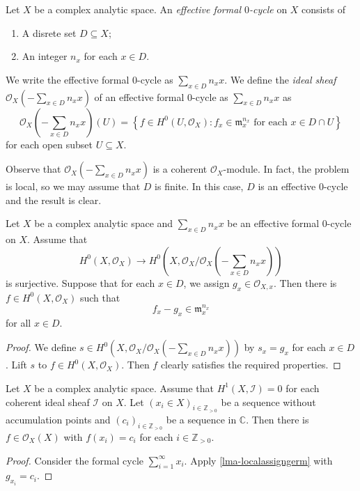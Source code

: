 \begin{definition}
    Let $X$ be a complex analytic space. An \emph{effective formal $0$-cycle} on $X$ consists of 
    \begin{enumerate}
        \item A disrete set $D\subseteq X$;
        \item An integer $n_x$ for each $x\in D$.
    \end{enumerate}
    We write the effective formal $0$-cycle as $\sum_{x\in D}n_x x$. We define the \emph{ideal sheaf} $\mathcal{O}_X(-\sum_{x\in D}n_x x)$ of an effective formal $0$-cycle as $\sum_{x\in D}n_x x$ as 
    \[
        \mathcal{O}_X(-\sum_{x\in D}n_x x)(U)=\left\{f\in H^0(U,\mathcal{O}_X): f_x\in \mathfrak{m}_x^{n_x}\text{ for each }x\in D\cap U \right\}
    \]
    for each open subset $U\subseteq X$.
\end{definition}
Observe that $\mathcal{O}_X(-\sum_{x\in D}n_x x)$ is a coherent $\mathcal{O}_X$-module. In fact, the problem is local, so we may assume that $D$ is finite. In this case, $D$ is an effective $0$-cycle and the result is clear.

\begin{lemma}\label{lma-localassigngerm}
    Let $X$ be a complex analytic space and $\sum_{x\in D}n_x x$ be an effective formal $0$-cycle on $X$. Assume that 
    \[
        H^0(X,\mathcal{O}_X)\rightarrow   H^0(X,\mathcal{O}_X/\mathcal{O}_X(-\sum_{x\in D}n_x x))
    \]
    is surjective. Suppose that for each $x\in D$, we assign $g_x\in \mathcal{O}_{X,x}$. Then there is $f\in H^0(X,\mathcal{O}_X)$ such that
    \[
        f_x-g_x\in \mathfrak{m}_x^{n_x}  
    \]
    for all $x\in D$.
\end{lemma}
\begin{proof}
    We define $s\in H^0(X,\mathcal{O}_X/\mathcal{O}_X(-\sum_{x\in D}n_x x))$ by $s_x=g_x$ for each $x\in D$. Lift $s$ to $f\in H^0(X,\mathcal{O}_X)$. Then $f$ clearly satisfies the required properties.
\end{proof}

\begin{proposition}\label{prop-assignvalue}
    Let $X$ be a complex analytic space. Assume that $H^1(X,\mathcal{I})=0$ for each coherent ideal sheaf $\mathcal{I}$ on $X$. Let $(x_i\in X)_{i\in \mathbb{Z}_{>0}}$ be a sequence without accumulation points and $(c_i)_{i\in \mathbb{Z}_{>0}}$ be a sequence in $\mathbb{C}$. Then there is $f\in \mathcal{O}_X(X)$ with $f(x_i)=c_i$ for each $i\in \mathbb{Z}_{>0}$.
\end{proposition}
\begin{proof}
    Consider the formal cycle $\sum_{i=1}^{\infty} x_i$. Apply \cref{lma-localassigngerm} with $g_{x_i}=c_i$.
\end{proof}




